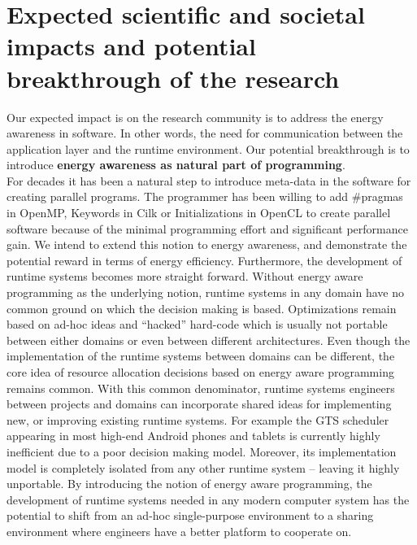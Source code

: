 \documentclass{article}
\begin{document}
\section{Expected scientific and societal impacts and potential breakthrough of the research}
Our expected impact is on the research community is to address the energy awareness in software. 
In other words, the need for communication between the application layer and the runtime environment. 
Our potential breakthrough is to introduce \textbf{energy awareness as natural part of programming}.\\ 
For decades it has been a natural step to introduce meta-data in the software for creating parallel programs. 
The programmer has been willing to add \#pragmas in OpenMP, Keywords in Cilk or Initializations in OpenCL to create parallel software because of the minimal programming effort and significant performance gain. 
We intend to extend this notion to energy awareness, and demonstrate the potential reward in terms of energy efficiency. 
Furthermore, the development of runtime systems becomes more straight forward. 
Without energy aware programming as the underlying notion, runtime systems in any domain have no common ground on which the decision making is based. 
Optimizations remain based on ad-hoc ideas and ``hacked'' hard-code which is usually not portable between either domains or even between different architectures. 
Even though the implementation of the runtime systems between domains can be different, the core idea of resource allocation decisions based on energy aware programming remains common. 
With this common denominator, runtime systems engineers between projects and domains can incorporate shared ideas for implementing new, or improving existing runtime systems. 
For example the GTS scheduler appearing in most high-end Android phones and tablets is currently highly inefficient due to a poor decision making model. 
Moreover, its implementation model is completely isolated from any other runtime system – leaving it highly unportable. 
By introducing the notion of energy aware programming, the development of runtime systems needed in any modern computer system has the potential to shift from an ad-hoc single-purpose environment to a sharing environment where engineers have a better platform to cooperate on.
\end{document}
